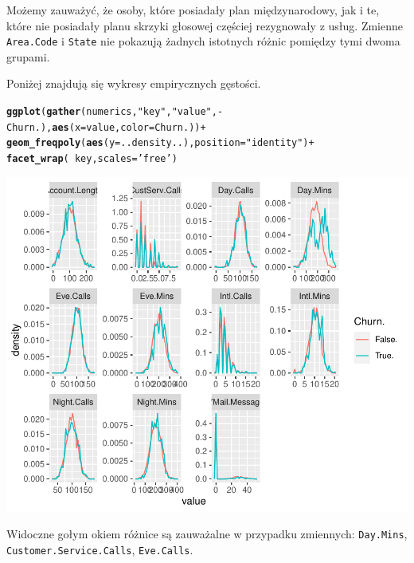 \documentclass{article}\usepackage[]{graphicx}\usepackage[]{color}
\makeatletter
\def\maxwidth{ %
  \ifdim\Gin@nat@width>\linewidth
    \linewidth
  \else
    \Gin@nat@width
  \fi
}
\newcommand{\hlstr}[1]{\textcolor[rgb]{0.192,0.494,0.8}{#1}}%
\newcommand{\hlopt}[1]{\textcolor[rgb]{0,0,0}{#1}}%
\newcommand{\hlstd}[1]{\textcolor[rgb]{0.345,0.345,0.345}{#1}}%
\newcommand{\hlkwc}[1]{\textcolor[rgb]{0.333,0.667,0.333}{#1}}%
\newcommand{\hlkwd}[1]{\textcolor[rgb]{0.737,0.353,0.396}{\textbf{#1}}}%
\newenvironment{kframe}{%
 \def\at@end@of@kframe{}%
 \ifinner\ifhmode%
  \def\at@end@of@kframe{\end{minipage}}%
  \begin{minipage}{\columnwidth}%
 \fi\fi%
 \def\FrameCommand##1{\hskip\@totalleftmargin \hskip-\fboxsep
 \colorbox{shadecolor}{##1}\hskip-\fboxsep
     \hskip-\linewidth \hskip-\@totalleftmargin \hskip\columnwidth}%
 \MakeFramed {\advance\hsize-\width
   \@totalleftmargin\z@ \linewidth\hsize
   \@setminipage}}%
 {\par\unskip\endMakeFramed%
 \at@end@of@kframe}
\newenvironment{knitrout}{}{} %
\makeatother
\begin{document}
Możemy zauważyć, że osoby, które posiadały plan międzynarodowy, jak i te, które nie posiadały planu skrzyki głosowej częściej rezygnowały z usług. Zmienne \verb|Area.Code| i \verb|State| nie pokazują żadnych istotnych różnic pomiędzy tymi dwoma grupami.


Poniżej znajdują się wykresy empirycznych gęstości.
\begin{knitrout}
\color{fgcolor}\begin{kframe}
\begin{alltt}
\hlkwd{ggplot}\hlstd{(}\hlkwd{gather}\hlstd{(numerics,} \hlstr{"key"}\hlstd{,} \hlstr{"value"}\hlstd{,} \hlopt{-}\hlstd{Churn.),} \hlkwd{aes}\hlstd{(}\hlkwc{x}\hlstd{=value,} \hlkwc{color}\hlstd{=Churn.))} \hlopt{+}
  \hlkwd{geom_freqpoly}\hlstd{(}\hlkwd{aes}\hlstd{(}\hlkwc{y}\hlstd{=..density..),} \hlkwc{position}\hlstd{=}\hlstr{"identity"}\hlstd{)} \hlopt{+}
  \hlkwd{facet_wrap}\hlstd{(}\hlopt{~}\hlstd{key,} \hlkwc{scales}\hlstd{=}\hlstr{'free'}\hlstd{)}
\end{alltt}
\end{kframe}

{\centering \includegraphics[width=\maxwidth]{figure/Densities-1} 

}



\end{knitrout}
Widoczne gołym okiem różnice są zauważalne w przypadku zmiennych: \verb|Day.Mins|, \verb|Customer.Service.Calls|, \verb|Eve.Calls|.
\end{document}
